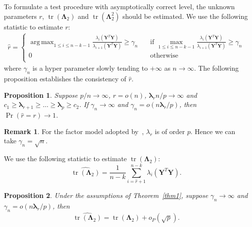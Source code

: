 \documentclass[12pt]{article} %
\DeclareMathOperator{\mytr}{tr}
\DeclareMathOperator*{\argmax}{arg\,max}
\newcommand{\bY}{\mathbf{Y}}
\newcommand{\bfsym}[1]{\ensuremath{\boldsymbol{#1}}}
\def\blambda {\bfsym {\lambda}}
\def\bLambda {\bfsym {\Lambda}}
\newtheorem{proposition}{Proposition}
\theoremstyle{definition}
\newtheorem{remark}{Remark}
\begin{document}
To formulate a test procedure with asymptotically correct level, the unknown parameters $r$, $\mytr(\bLambda_2)$ and $\mytr(\bLambda_2^2)$ should be estimated.
We use the following statistic to estimate $r$:
    $$
    \begin{aligned}
    \hat{r}=
            \begin{cases}
                \argmax_{1\leq i\leq n-k-1} \frac{\lambda_i(\bY^T \bY)}{\lambda_{i+1}(\bY^T \bY)}\geq \gamma_n\quad& \text{if } \max_{1\leq i\leq n-k-1}\frac{\lambda_i(\bY^T \bY)}{\lambda_{i+1}(\bY^T \bY)}\geq \gamma_n\\
                0\quad&\text{otherwise}\\
            \end{cases}
    \end{aligned}
    $$
where $\gamma_n$ is a hyper parameter slowly tending to $+\infty$ as $n\to \infty$.
The following proposition establishes the consistency of $\hat{r}$.
\begin{proposition}\label{numberConsistency}
    Suppose $p/n\to \infty$, $r=o(n)$, $\blambda_r n/p\to \infty$ and $c_1\geq\blambda_{r+1}\geq \ldots \geq \blambda_p\geq c_2$. If $\gamma_n\to \infty$ and $\gamma_n = o(n\blambda_r/p)$, then
 $\Pr(\hat{r}=r)\to 1$.
\end{proposition}
\begin{remark}
    For the factor model adopted by~\cite{Ma2015A}, $\lambda_r$ is of order $p$. Hence we can take $\gamma_n=\sqrt{n}$.
\end{remark}
    We use the following statistic to estimate $\mytr(\bLambda_2)$:
    $$\widehat{\mytr(\bLambda_2)}=\frac{1}{n-k}\sum_{i=\hat{r}+1}^{n-k}\lambda_i(\bY^T \bY).$$
\begin{proposition}\label{traceProp1}
    Under the assumptions of Theorem~\ref{thm1}, suppose $\gamma_n\to \infty$ and $\gamma_n=o({n\blambda_r}/{p})$, then
    $$\widehat{\mytr(\bLambda_2)}=\mytr(\bLambda_2)+o_P(\sqrt{p}).$$
\end{proposition}
\end{document}
